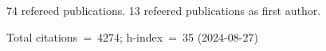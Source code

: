 74 refereed publications. 13 refeered publications as first author.

Total citations~=~4274; h-index~=~35 (2024-08-27)